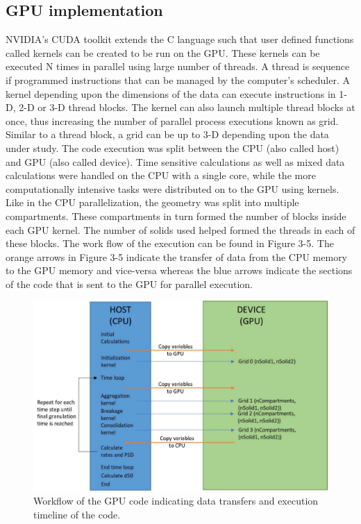 \documentclass[preprint,10pt,authoryear,review]{elsarticle}
\begin{document}
\begin{linenumbers}
\subsection{GPU implementation}
NVIDIA’s CUDA toolkit extends the C language such that user defined functions 
called kernels can be created to be run on the GPU. These kernels can be 
executed N times in parallel using large number of threads. A thread is 
sequence if programmed instructions that can be managed by the computer’s 
scheduler. A kernel depending upon the dimensions of the data can execute 
instructions in 1-D, 2-D or 3-D thread blocks. The kernel can also launch 
multiple thread blocks at once, thus increasing the number of parallel 
process executions known as grid. Similar to a thread block, a grid can 
be up to 3-D depending upon the data under study.
The code execution was split between the CPU (also called host) and GPU 
(also called device). Time sensitive calculations as well as mixed data 
calculations were handled on the CPU with a single core, while the more 
computationally intensive tasks were distributed on to the GPU using 
kernels. Like in the CPU parallelization, the geometry was split into 
multiple compartments. These compartments in turn formed the number of 
blocks inside each GPU kernel. The number of solids used helped formed 
the threads in each of these blocks. The work flow of the execution can 
be found in Figure 3-5. The orange arrows in Figure 3-5 indicate the 
transfer of data from the CPU memory to the GPU memory and vice-versa 
whereas the blue arrows indicate the sections of the code that is sent 
to the GPU for parallel execution.

\begin{figure}
\centering
\includegraphics[scale=0.4]{gpuImp_schematic.pdf}
\caption{Workflow of the GPU code indicating data transfers and execution timeline of the code.}
\label{fig:mtd_gpu_imp}
\end{figure}


\end{linenumbers}
\end{document}
